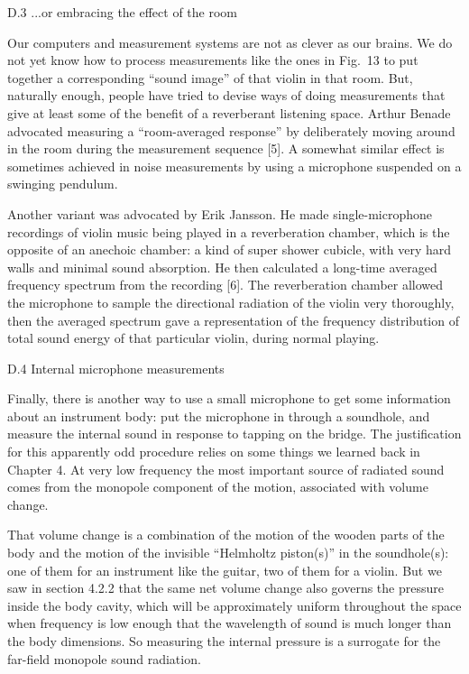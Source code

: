   D.3 ...or embracing the effect of the room 

  Our computers and measurement systems are not as clever as our brains. We do 
  not yet know how to process measurements like the ones in Fig.\ 13 to put 
  together a corresponding “sound image” of that violin in that room. But, 
  naturally enough, people have tried to devise ways of doing measurements that 
  give at least some of the benefit of a reverberant listening space. Arthur 
  Benade advocated measuring a “room-averaged response” by deliberately moving 
  around in the room during the measurement sequence [5]. A somewhat similar 
  effect is sometimes achieved in noise measurements by using a microphone 
  suspended on a swinging pendulum. 

  Another variant was advocated by Erik Jansson. He made single-microphone 
  recordings of violin music being played in a reverberation chamber, which is 
  the opposite of an anechoic chamber: a kind of super shower cubicle, with 
  very hard walls and minimal sound absorption. He then calculated a long-time 
  averaged frequency spectrum from the recording [6]. The reverberation chamber 
  allowed the microphone to sample the directional radiation of the violin very 
  thoroughly, then the averaged spectrum gave a representation of the frequency 
  distribution of total sound energy of that particular violin, during normal 
  playing. 

  D.4 Internal microphone measurements 

  Finally, there is another way to use a small microphone to get some 
  information about an instrument body: put the microphone in through a 
  soundhole, and measure the internal sound in response to tapping on the 
  bridge. The justification for this apparently odd procedure relies on some 
  things we learned back in Chapter 4. At very low frequency the most important 
  source of radiated sound comes from the monopole component of the motion, 
  associated with volume change. 

  That volume change is a combination of the motion of the wooden parts of the 
  body and the motion of the invisible “Helmholtz piston(s)” in the 
  soundhole(s): one of them for an instrument like the guitar, two of them for 
  a violin. But we saw in section 4.2.2 that the same net volume change also 
  governs the pressure inside the body cavity, which will be approximately 
  uniform throughout the space when frequency is low enough that the wavelength 
  of sound is much longer than the body dimensions. So measuring the internal 
  pressure is a surrogate for the far-field monopole sound radiation. 

